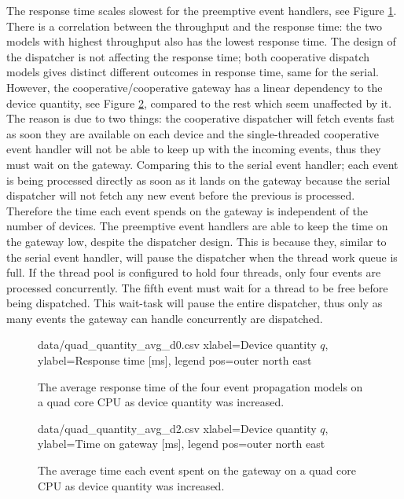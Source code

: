 The response time scales slowest for the preemptive event handlers, see Figure
\ref{fig:quad_quantity_avg_d0}. There is a correlation between the throughput
and the response time: the two models with highest throughput also has the
lowest response time. The design of the dispatcher is not affecting the
response time; both cooperative dispatch models gives distinct different
outcomes in response time, same for the serial. However, the
cooperative/cooperative gateway has a linear dependency to the device quantity,
see Figure \ref{fig:quad_quantity_avg_d2}, compared to the rest which seem
unaffected by it. The reason is due to two things: the cooperative dispatcher
will fetch events fast as soon they are available on each device and the
single-threaded cooperative event handler will not be able to keep up with the
incoming events, thus they must wait on the gateway. Comparing this to the
serial event handler; each event is being processed directly as soon as it
lands on the gateway because the serial dispatcher will not fetch any new event
before the previous is processed. Therefore the time each event spends on the
gateway is independent of the number of devices. The preemptive event handlers
are able to keep the time on the gateway low, despite the dispatcher design.
This is because they, similar to the serial event handler, will pause the
dispatcher when the thread work queue is full. If the thread pool is configured
to hold four threads, only four events are processed concurrently. The fifth
event must wait for a thread to be free before being dispatched. This wait-task
will pause the entire dispatcher, thus only as many events the gateway can
handle concurrently are dispatched.

\begin{figure}[h!]
    \centering
    \performanceplot
    {data/quad_quantity_avg_d0.csv}
    {
        xlabel=Device quantity $q$,
        ylabel={Response time [ms]},
        legend pos=outer north east
    }

    \caption[Response time result when device quantity was increased.]{The
    average response time of the four event propagation models on a quad core
    CPU as device quantity was increased.}

    \label{fig:quad_quantity_avg_d0}
\end{figure}

\begin{figure}[h!]
    \centering
    \performanceplot
    {data/quad_quantity_avg_d2.csv}
    {
        xlabel=Device quantity $q$,
        ylabel={Time on gateway [ms]},
        legend pos=outer north east
    }

    \caption[Time spent on gateway when device quantity was increased.]{The
    average time each event spent on the gateway on a quad core CPU as device
    quantity was increased.}

    \label{fig:quad_quantity_avg_d2}
\end{figure}

